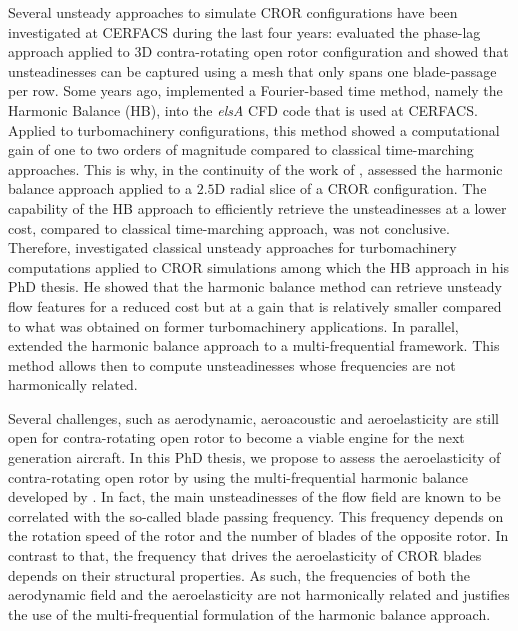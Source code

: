 Several unsteady approaches to simulate CROR configurations
have been investigated at CERFACS during the
last four years: \citet{Burnazzi2010} evaluated the phase-lag approach
applied to 3D contra-rotating open rotor configuration and showed
that unsteadinesses can be captured using a mesh that only spans one
blade-passage per row. 
Some years ago, \citet{ThesisSicot} implemented a 
Fourier-based time method, namely the Harmonic Balance (HB),
into the \emph{elsA} CFD code that is used at CERFACS. Applied to turbomachinery
configurations, this method showed a computational gain
of one to two orders of magnitude 
compared to classical time-marching approaches.
This is why, in the continuity of the work
of \citet{Burnazzi2010}, \citet{Yabili2010} assessed 
the harmonic balance approach applied to 
a $2.5$D radial slice of a CROR configuration. 
The capability
of the HB approach to efficiently retrieve the unsteadinesses
at a lower cost, compared to classical time-marching approach,
 was not conclusive.
Therefore, \citet{ThesisFrancois}
investigated classical unsteady approaches for
turbomachinery computations applied to CROR simulations
among which the HB approach in his PhD thesis. 
He showed that
the harmonic balance method can retrieve unsteady
flow features for a reduced cost but at a gain that
is relatively smaller compared to what was
obtained on former turbomachinery applications. 
In parallel, \citet{ThesisGuedeney} extended the harmonic
balance approach to a multi-frequential framework. 
This method allows then to compute unsteadinesses whose frequencies
are not harmonically related.

Several challenges, such as aerodynamic,
aeroacoustic and aeroelasticity are still open 
for contra-rotating open rotor
to become a viable engine for the next generation aircraft.
In this PhD thesis, we propose to assess the aeroelasticity of 
contra-rotating open rotor by using the multi-frequential
harmonic balance developed by \citet{ThesisGuedeney}.
In fact, the main unsteadinesses of the flow field
are known to be correlated with the so-called
blade passing frequency. This frequency depends on the
rotation speed of the rotor and the number of blades
of the opposite rotor. In contrast to that, the 
frequency that drives the aeroelasticity of CROR
blades depends on their structural properties.
As such, the frequencies of both the aerodynamic
field and the aeroelasticity are not harmonically
related and justifies the use of the multi-frequential
formulation of the harmonic balance approach.


